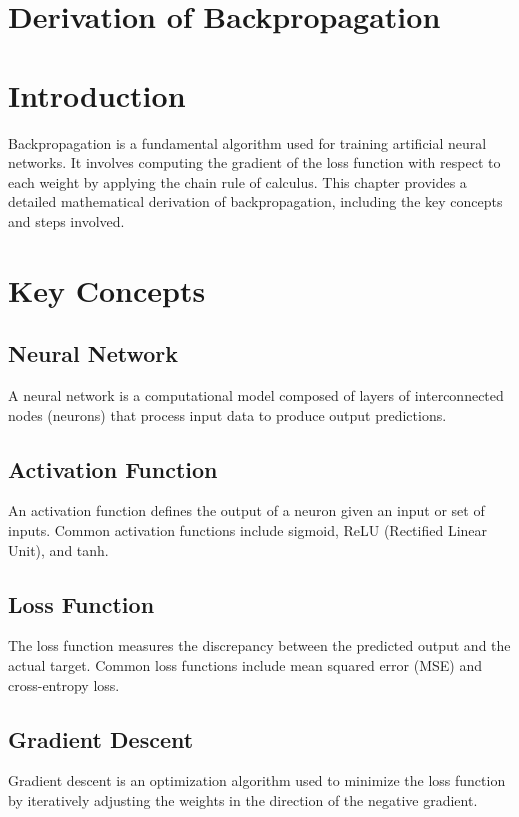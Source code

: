 \section{Derivation of Backpropagation}

\section{Introduction}
Backpropagation is a fundamental algorithm used for training artificial neural networks. It involves computing the gradient of the loss function with respect to each weight by applying the chain rule of calculus. This chapter provides a detailed mathematical derivation of backpropagation, including the key concepts and steps involved. 

\section{Key Concepts}

\subsection{Neural Network}
A neural network is a computational model composed of layers of interconnected nodes (neurons) that process input data to produce output predictions.

\subsection{Activation Function}
An activation function defines the output of a neuron given an input or set of inputs. Common activation functions include sigmoid, ReLU (Rectified Linear Unit), and tanh.

\subsection{Loss Function}
The loss function measures the discrepancy between the predicted output and the actual target. Common loss functions include mean squared error (MSE) and cross-entropy loss.

\subsection{Gradient Descent}
Gradient descent is an optimization algorithm used to minimize the loss function by iteratively adjusting the weights in the direction of the negative gradient.

